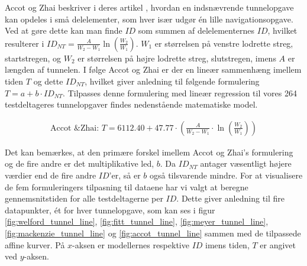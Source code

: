 Accot og Zhai beskriver i deres artikel \cite{accot1997}, hvordan en indsnævrende tunnelopgave kan opdeles i små delelementer, som hver især udgør én lille navigationsopgave. Ved at gøre dette kan man finde $ID$ som summen af delelementernes $ID$, hvilket resulterer i $ID_{NT} = \frac{A}{W_2-W_1}\ln\left(\frac{W_2}{W_1}\right)$. $W_1$ er størrelsen på venstre lodrette streg, startstregen, og $W_2$ er størrelsen på højre lodrette streg, slutstregen, imens $A$ er længden af tunnelen. I følge Accot og Zhai er der en lineær sammenhæng imellem tiden $T$ og dette $ID_{NT}$, hvilket giver anledning til følgende formulering $T = a+b\cdot ID_{NT}$. Tilpasses denne formulering med lineær regression til vores 264 testdeltageres tunnelopgaver findes nedenstående matematiske model.

\begin{align*}
\text{Accot \& Zhai: } T = 6112.40+47.77 \cdot \left(\frac{A}{W_2-W_1}\cdot\ln\left(\frac{W_2}{W_1 }\right)\right)
\end{align*}

Det kan bemærkes, at den primære forskel imellem Accot og Zhai's formulering og de fire andre er det multiplikative led, $b$. Da $ID_{NT}$ antager væsentligt højere værdier end de fire andre $ID$'er, så er $b$ også tilsvarende mindre. For at visualisere de fem formuleringers tilpasning til dataene har vi valgt at beregne gennemsnitstiden for alle testdeltagerne per $ID$. Dette giver anledning til fire datapunkter, ét for hver tunnelopgave, som kan ses i figur \ref{fig:welford_tunnel_line}, \ref{fig:fitt_tunnel_line}, \ref{fig:meyer_tunnel_line},\ref{fig:mackenzie_tunnel_line} og \ref{fig:accot_tunnel_line} sammen med de tilpassede affine kurver. På $x$-aksen er modellernes respektive $ID$ imens tiden, $T$ er angivet ved $y$-aksen. 

